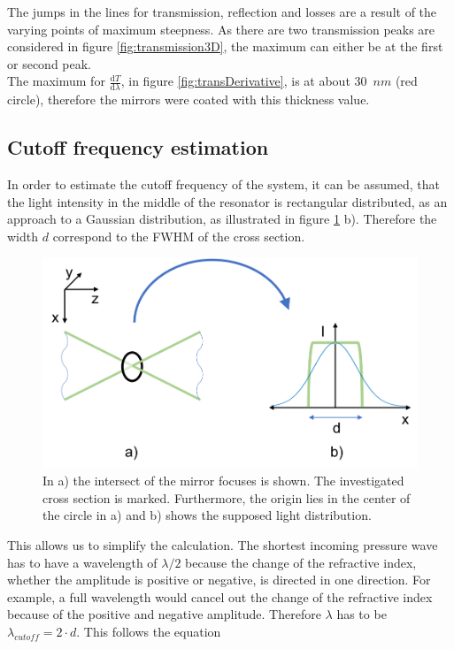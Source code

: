 The jumps in the lines for transmission, reflection and losses are a result of the varying points of maximum steepness. As there are two transmission peaks are considered in figure \ref{fig:transmission3D}, the maximum can either be at the first or second peak.\\
The maximum for $\frac{\mathrm{d}T}{\mathrm{d}\lambda}$, in figure \ref{fig:transDerivative}, is at about 30~$nm$ (red circle), therefore the mirrors were coated with this thickness value.  

\subsection{Cutoff frequency estimation}
\label{sec:cutOffFreq}

In order to estimate the cutoff frequency of the system, it can be assumed, that the light intensity in the middle of the resonator is rectangular distributed, as an approach to a Gaussian distribution, as illustrated in figure \ref{fig:lightDist} b). Therefore the width $d$ correspond to the FWHM of the cross section.  

\begin{figure}[H]
	\centering
	\includegraphics[height=0.4\textheight]{05_OUSD/images/lightDistribution.png}
	\caption{In a) the intersect of the mirror focuses is shown. The investigated cross section is marked. Furthermore, the origin lies in the center of the circle in a) and b) shows the supposed light distribution.}
	\label{fig:lightDist}
\end{figure} 

This allows us to simplify the calculation. The shortest incoming pressure wave has to have a wavelength of $\lambda/2$ because the change of the refractive index, whether the amplitude is positive or negative, is directed in one direction. For example, a full wavelength would cancel out the change of the refractive index because of the positive and negative amplitude. Therefore $\lambda$ has to be $\lambda_{cutoff} = 2 \cdot d$. This follows the equation

